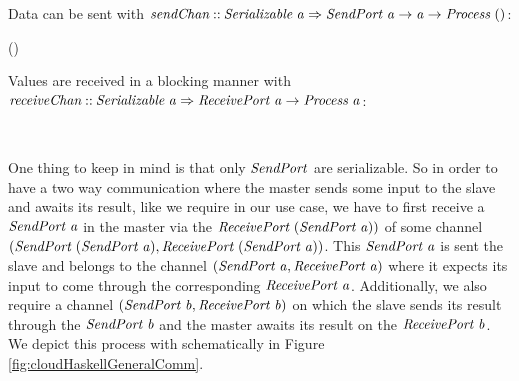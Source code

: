 \documentclass[paper=A4,twoside=true,openright,parskip=full,chapterprefix=true,headings=normal,bibliography=totoc,listof=totoc,titlepage=on,captions=tableabove,draft=false,british]{scrreprt}%
\begin{document}
Data can be sent with
\ensuremath{\Varid{sendChan}\mathbin{::}\Conid{Serializable}\;\Varid{a}\Rightarrow \Conid{SendPort}\;\Varid{a}\to \Varid{a}\to \Conid{Process}\;()}:


\begin{hscode}\SaveRestoreHook
{}%
%
\>[B]{}\mathbin{::}\;\to {}\;(){}\<[E]%
\\
\>[B]{}\;\mathrel{=}\;\;\<[E]%
\ColumnHook
\end{hscode}\resethooks
\vspace{-2\baselineskip}

Values are received in a blocking manner with
\ensuremath{\Varid{receiveChan}\mathbin{::}\Conid{Serializable}\;\Varid{a}\Rightarrow \Conid{ReceivePort}\;\Varid{a}\to \Conid{Process}\;\Varid{a}}:


\begin{hscode}\SaveRestoreHook
{}%
%
\>[B]{}\mathbin{::}\;\to {}\;\<[E]%
\\
\>[B]{}\;\mathrel{=}\;\<[E]%
\ColumnHook
\end{hscode}\resethooks
\vspace{-2\baselineskip}

One thing to keep in mind is that only \ensuremath{\Conid{SendPort}} are serializable. So
in order to have a two way communication where the master sends some
input to the slave and awaits its result, like we require in our use
case, we have to first receive a \ensuremath{\Conid{SendPort}\;\Varid{a}} in the master via the
\ensuremath{\Conid{ReceivePort}\;(\Conid{SendPort}\;\Varid{a}))} of some channel
\ensuremath{(\Conid{SendPort}\;(\Conid{SendPort}\;\Varid{a}),\Conid{ReceivePort}\;(\Conid{SendPort}\;\Varid{a}))}. This \ensuremath{\Conid{SendPort}\;\Varid{a}}
is sent the slave and belongs to the channel
\ensuremath{(\Conid{SendPort}\;\Varid{a},\Conid{ReceivePort}\;\Varid{a})} where it expects its input to come through
the corresponding \ensuremath{\Conid{ReceivePort}\;\Varid{a}}. Additionally, we also require a
channel \ensuremath{(\Conid{SendPort}\;\Varid{b},\Conid{ReceivePort}\;\Varid{b})} on which the slave sends its
result through the \ensuremath{\Conid{SendPort}\;\Varid{b}} and the master awaits its result on the
\ensuremath{\Conid{ReceivePort}\;\Varid{b}}. We depict this process with schematically in Figure
\ref{fig:cloudHaskellGeneralComm}.
\end{document}
